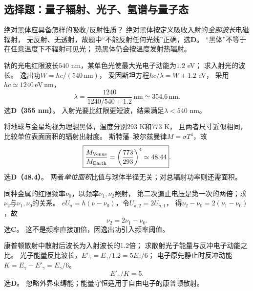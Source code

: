 
\subsection{选择题：量子辐射、光子、氢谱与量子态}

\problemtext 绝对黑体应具备怎样的吸收/反射性质？
\workings
绝对黑体按定义吸收入射的\emph{全部波长}电磁辐射，
无反射、无透射，故题中“不能反射任何光线”正确，选\textbf{D}。
\crosscheck “黑体”不等于在任意温度下不辐射可见光；
热黑体仍会按温度发射热辐射。

\problemtext 钠的光电红限波长$540$ nm，某单色光使最大光电子动能为$1.2$ eV；
求入射光的波长。
\workings
逸出功$W=hc/(540\,\mathrm{nm})$，
爱因斯坦方程$hc/\lambda=W+1.2$ eV，
采用$hc\simeq1240\,\mathrm{eV\,nm}$，
\[
\boxed{\lambda=\frac{1240}{1240/540+1.2}\,\mathrm{nm}
\simeq354.6\,\mathrm{nm}}.
\]
选\textbf{D（355 nm）}。
\crosscheck 入射光要比红限更短波，结果满足$\lambda<540$ nm。

\problemtext 将地球与金星均视为理想黑体，温度分别$293$ K和$773$ K，
且两者尺寸近似相同，比较单位表面面积的辐射出射度。
\workings
斯特藩--玻尔兹曼律$M=\sigma T^4$，故
\[
\boxed{\frac{M_{\rm Venus}}{M_{\rm Earth}}
=\left(\frac{773}{293}\right)^4\simeq48.44}.
\]
选\textbf{D（48.4）}。
\crosscheck 两者\emph{单位面积}比值与球体半径无关；对总辐射功率则还需面积。

\problemtext 同种金属的红限频率$\nu_0$，以频率$\nu_1,\nu_2$照射，
第二次遏止电压是第一次的两倍；求$\nu_2$与$\nu_1,\nu_0$的关系。
\workings
$eU_a=h(\nu-\nu_0)$，令$U_{a,2}=2U_{a,1}$，
得$\nu_2-\nu_0=2(\nu_1-\nu_0)$，故
\[
\boxed{\nu_2=2\nu_1-\nu_0}.
\]
选\textbf{C}。
\crosscheck 这不是频率直接加倍，因逸出功引入频率阈值。

\problemtext 康普顿散射中散射后波长为入射波长的1.2倍；
求散射光子能量与反冲电子动能之比。
\workings
光子能量反比波长，$E'_{\gamma}=E_\gamma/1.2=5E_\gamma/6$；
电子原先静止时反冲动能$K=E_\gamma-E'_\gamma=E_\gamma/6$。
\[
\boxed{E'_\gamma/K=5}.
\]
选\textbf{D}。
\crosscheck 忽略外界束缚能；能量守恒适用于自由电子的康普顿散射。

